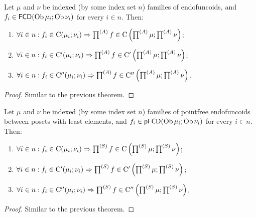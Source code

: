 \begin{thm}
Let $\mu$ and $\nu$ be indexed (by some index set $n$) families
of endofuncoids, and $f_{i}\in\mathsf{FCD}(\operatorname{Ob}\mu_{i};\operatorname{Ob}\nu_{i})$
for every $i\in n$. Then:
\begin{enumerate}
\item $\forall i\in n:f_{i}\in\mathrm{C}(\mu_{i};\nu_{i})\Rightarrow\prod^{(A)}f\in\mathrm{C}\left(\prod^{(A)}\mu;\prod^{(A)}\nu\right)$;
\item $\forall i\in n:f_{i}\in\mathrm{C}'(\mu_{i};\nu_{i})\Rightarrow\prod^{(A)}f\in\mathrm{C}'\left(\prod^{(A)}\mu;\prod^{(A)}\nu\right)$;
\item $\forall i\in n:f_{i}\in\mathrm{C}''(\mu_{i};\nu_{i})\Rightarrow\prod^{(A)}f\in\mathrm{C}''\left(\prod^{(A)}\mu;\prod^{(A)}\nu\right)$.
\end{enumerate}
\end{thm}
\begin{proof}
Similar to the previous theorem.\end{proof}
\begin{thm}
Let $\mu$ and $\nu$ be indexed (by some index set $n$) families
of pointfree endofuncoids between posets with least elements, and
$f_{i}\in\mathsf{pFCD}(\operatorname{Ob}\mu_{i};\operatorname{Ob}\nu_{i})$ for every $i\in n$.
Then:
\begin{enumerate}
\item $\forall i\in n:f_{i}\in\mathrm{C}(\mu_{i};\nu_{i})\Rightarrow\prod^{(S)}f\in\mathrm{C}\left(\prod^{(S)}\mu;\prod^{(S)}\nu\right)$;
\item $\forall i\in n:f_{i}\in\mathrm{C}'(\mu_{i};\nu_{i})\Rightarrow\prod^{(S)}f\in\mathrm{C}'\left(\prod^{(S)}\mu;\prod^{(S)}\nu\right)$;
\item $\forall i\in n:f_{i}\in\mathrm{C}''(\mu_{i};\nu_{i})\Rightarrow\prod^{(S)}f\in\mathrm{C}''\left(\prod^{(S)}\mu;\prod^{(S)}\nu\right)$.
\end{enumerate}
\end{thm}
\begin{proof}
Similar to the previous theorem.
\end{proof}

